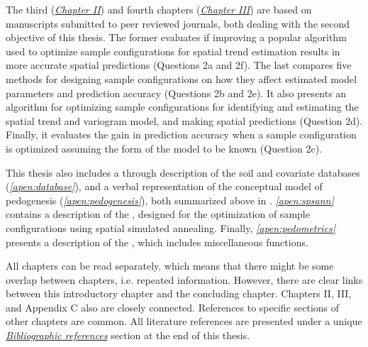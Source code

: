 The third (\hyperref[chap:chapter02]{\textit{Chapter II}}) and fourth chapters 
(\hyperref[chap:chapter03]{\textit{Chapter III}}) are based on manuscripts submitted to peer 
reviewed journals, both dealing with the second objective of this thesis. The former evaluates if 
improving a popular algorithm used to optimize sample configurations for spatial trend estimation 
results in more accurate spatial predictions (Questions 2a and 2f). The last compares five methods 
for designing sample configurations on how they affect estimated model parameters and prediction 
accuracy (Questions 2b and 2e). It also presents an algorithm for optimizing sample configurations 
for identifying and estimating the spatial trend and variogram model, and making spatial predictions
(Question 2d). Finally, it evaluates the gain in prediction accuracy when a sample configuration is 
optimized assuming the form of the model to be known (Question 2c).

This thesis also includes a through description of the soil and covariate databases 
(\textit{\autoref{apen:database}}), and a verbal representation of the conceptual model of 
pedogenesis (\textit{\autoref{apen:pedogenesis}}), both summarized above in .
\textit{\autoref{apen:spsann}} contains a description of the , designed for the 
optimization of sample configurations using spatial simulated annealing. Finally, 
\textit{\autoref{apen:pedometrics}} presents a description of the , which 
includes miscellaneous functions.

All chapters can be read separately, which means that there might be some overlap between chapters, 
i.e. repeated information. However, there are clear links between this introductory chapter 
and the concluding chapter. Chapters II, III, and Appendix C also are closely connected. References 
to specific sections of other chapters are common. All literature references are presented under a
unique \hyperref[chap:references]{\textit{Bibliographic references}} section at the end of this
thesis.
